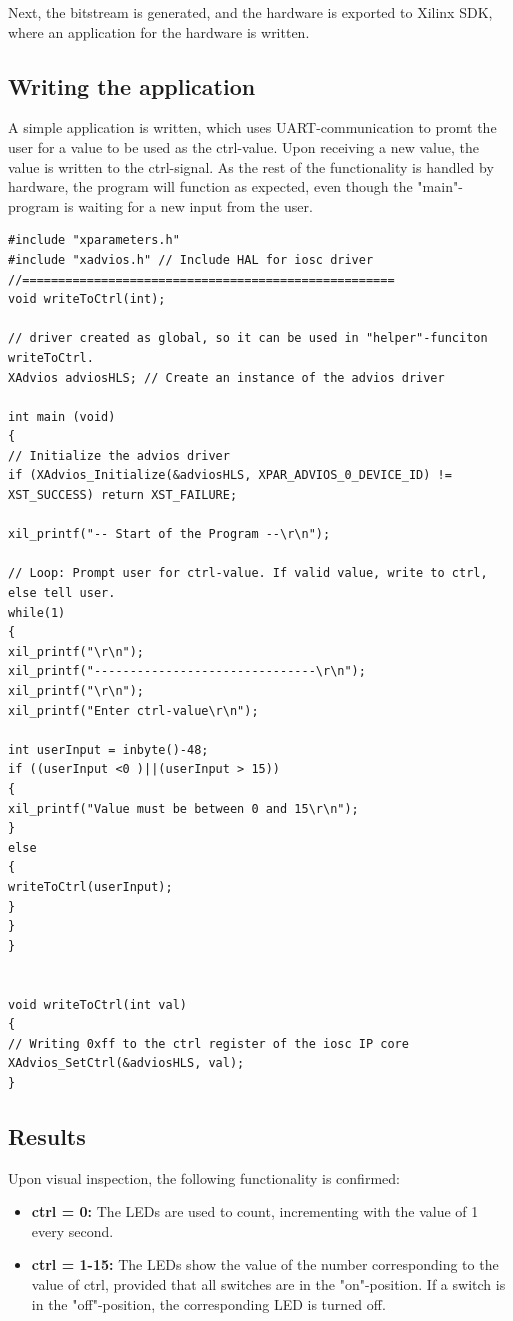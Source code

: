 Next, the bitstream is generated, and the hardware is exported to Xilinx SDK, where an application for the hardware is written.

\subsection{Writing the application}
A simple application is written, which uses UART-communication to promt the user for a value to be used as the ctrl-value. Upon receiving a new value, the value is written to the ctrl-signal. As the rest of the functionality is handled by hardware, the program will function as expected, even though the "main"-program is waiting for a new input from the user.

\begin{lstlisting}
#include "xparameters.h"
#include "xadvios.h" // Include HAL for iosc driver
//====================================================
void writeToCtrl(int);

// driver created as global, so it can be used in "helper"-funciton writeToCtrl.
XAdvios adviosHLS; // Create an instance of the advios driver

int main (void)
{
// Initialize the advios driver
if (XAdvios_Initialize(&adviosHLS, XPAR_ADVIOS_0_DEVICE_ID) != XST_SUCCESS) return XST_FAILURE;

xil_printf("-- Start of the Program --\r\n");

// Loop: Prompt user for ctrl-value. If valid value, write to ctrl, else tell user.
while(1)
{
xil_printf("\r\n");
xil_printf("-------------------------------\r\n");
xil_printf("\r\n");
xil_printf("Enter ctrl-value\r\n");

int userInput = inbyte()-48;
if ((userInput <0 )||(userInput > 15))
{
xil_printf("Value must be between 0 and 15\r\n");
}
else
{
writeToCtrl(userInput);
}
}
}


void writeToCtrl(int val)
{
// Writing 0xff to the ctrl register of the iosc IP core
XAdvios_SetCtrl(&adviosHLS, val);
}
\end{lstlisting}
\subsection{Results}
Upon visual inspection, the following functionality is confirmed:
\begin{itemize}
	\item \textbf{ctrl = 0:} The LEDs are used to count, incrementing with the value of 1 every second.
	\item \textbf{ctrl = 1-15:} The LEDs show the value of the number corresponding to the value of ctrl, provided that all switches are in the "on"-position. If a switch is in the "off"-position, the corresponding LED is turned off. 
\end{itemize}

